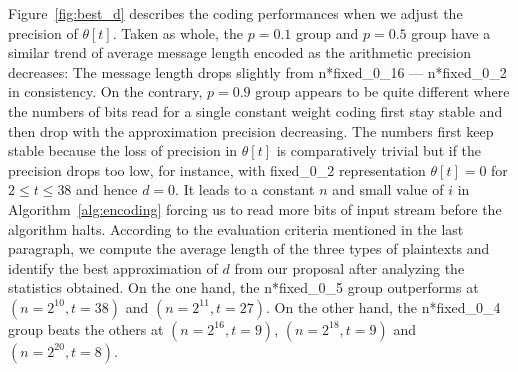 \documentclass[10pt,journal,compsoc]{IEEEtran}
\begin{document}
Figure~\ref{fig:best_d} describes the coding performances when we adjust the precision of $\theta[t]$.
Taken as whole, the $p=0.1$ group and $p=0.5$ group have a similar trend of average message length encoded as the arithmetic precision decreases:
The message length drops slightly from n*fixed\_0\_16 --- n*fixed\_0\_2 in consistency. On the contrary,
 $p=0.9$ group appears to be quite different where the numbers of bits read for a single constant weight coding first stay stable
 and then drop with the approximation precision decreasing. The numbers first keep stable because the loss of precision in $\theta[t]$ is comparatively trivial but if
 the precision drops too low, for instance, with fixed\_0\_2 representation $\theta[t]=0$ for $2\leq t \leq 38$ and hence $d=0$. It leads to a constant $n$ and small value of $i$
  in Algorithm~\ref{alg:encoding} forcing us to read more bits of input stream before the algorithm halts. According to the evaluation criteria mentioned in the last paragraph,
we compute the average length of the three types of plaintexts and identify the best approximation of $d$ from our proposal after analyzing the statistics obtained.
On the one hand,  the n*fixed\_0\_5 group outperforms at $(n=2^{10},t=38)$ and $(n=2^{11},t=27)$.
On the other hand, the n*fixed\_0\_4 group  beats the others at $(n=2^{16},t=9)$, $(n=2^{18},t=9)$  and $(n=2^{20},t=8)$.

\end{document}
